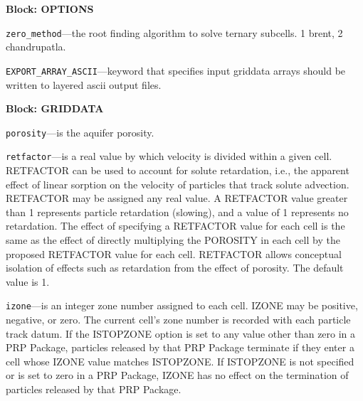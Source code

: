 
\item \textbf{Block: OPTIONS}

\begin{description}
\item \texttt{zero\_method}---the root finding algorithm to solve ternary subcells.  1 brent, 2 chandrupatla.

\item \texttt{EXPORT\_ARRAY\_ASCII}---keyword that specifies input griddata arrays should be written to layered ascii output files.

\end{description}
\item \textbf{Block: GRIDDATA}

\begin{description}
\item \texttt{porosity}---is the aquifer porosity.

\item \texttt{retfactor}---is a real value by which velocity is divided within a given cell.  RETFACTOR can be used to account for solute retardation, i.e., the apparent effect of linear sorption on the velocity of particles that track solute advection.  RETFACTOR may be assigned any real value.  A RETFACTOR value greater than 1 represents particle retardation (slowing), and a value of 1 represents no retardation.  The effect of specifying a RETFACTOR value for each cell is the same as the effect of directly multiplying the POROSITY in each cell by the proposed RETFACTOR value for each cell.  RETFACTOR allows conceptual isolation of effects such as retardation from the effect of porosity.  The default value is 1.

\item \texttt{izone}---is an integer zone number assigned to each cell.  IZONE may be positive, negative, or zero.  The current cell's zone number is recorded with each particle track datum.  If the ISTOPZONE option is set to any value other than zero in a PRP Package, particles released by that PRP Package terminate if they enter a cell whose IZONE value matches ISTOPZONE.  If ISTOPZONE is not specified or is set to zero in a PRP Package, IZONE has no effect on the termination of particles released by that PRP Package.

\end{description}

